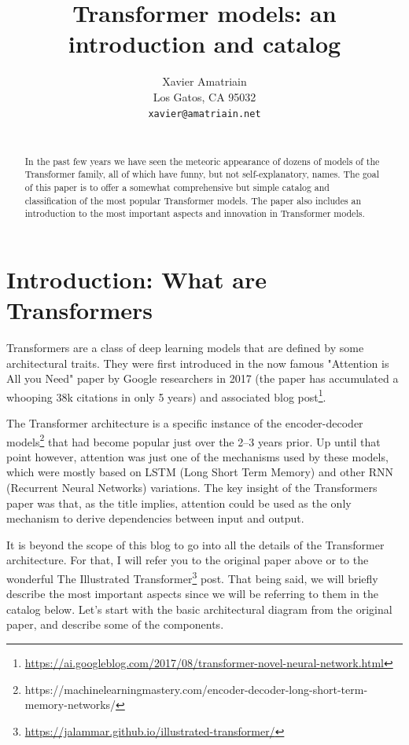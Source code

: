 \documentclass{article}
\title{Transformer models: an introduction and catalog}
\author{
 Xavier Amatriain \\
  Los Gatos, CA 95032 \\
  \texttt{xavier@amatriain.net} \\
 \\
}
\begin{document}
\maketitle
\begin{abstract}
In the past few years we have seen the meteoric appearance of dozens of models of the Transformer family, all of which have funny, but not self-explanatory, names. The goal of this paper is to offer a somewhat comprehensive but simple catalog and classification of the most popular Transformer models. The paper also includes an introduction to the most important aspects and innovation in Transformer models.
\end{abstract}

\tableofcontents



\section{Introduction: What are Transformers}

Transformers are a class of deep learning models that are defined by some architectural traits. They were first introduced in the now famous "Attention is All you Need" paper by Google researchers in 2017 \cite{vaswani2017attention} (the paper has accumulated a whooping 38k citations in only 5 years) and associated blog post\footnote{\url{https://ai.googleblog.com/2017/08/transformer-novel-neural-network.html}}.

The Transformer architecture is a specific instance of the encoder-decoder models\cite{cho2014properties}\footnote{https://machinelearningmastery.com/encoder-decoder-long-short-term-memory-networks/} that had become popular just over the 2–3 years prior. Up until that point however, attention was just one of the mechanisms used by these models, which were mostly based on LSTM (Long Short Term Memory)\cite{hochreiter1997long} and other RNN (Recurrent Neural Networks)\cite{mikolov2010recurrent} variations. The key insight of the Transformers paper was that, as the title implies, attention could be used as the only mechanism to derive dependencies between input and output.

It is beyond the scope of this blog to go into all the details of the Transformer architecture. For that, I will refer you to the original paper above or to the wonderful The Illustrated Transformer\footnote{\url{https://jalammar.github.io/illustrated-transformer/}} post. That being said, we will briefly describe the most important aspects since we will be referring to them in the catalog below. Let’s start with the basic architectural diagram from the original paper, and describe some of the components.
\end{document}
